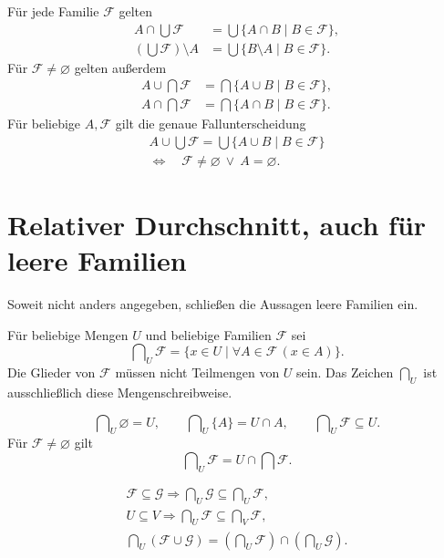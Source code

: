 \begin{theorem}
Für jede Familie $\mathcal F$ gelten
\[
\begin{aligned}
 A\cap\bigcup\mathcal F
       &=\bigcup\{A\cap B\mid B\in\mathcal F\},\\
 (\bigcup\mathcal F)\setminus A
       &=\bigcup\{B\setminus A\mid B\in\mathcal F\}.
\end{aligned}
\]
Für $\mathcal F\ne\varnothing$ gelten außerdem
\[
\begin{aligned}
 A\cup\bigcap\mathcal F
       &=\bigcap\{A\cup B\mid B\in\mathcal F\},\\
 A\cap\bigcap\mathcal F
       &=\bigcap\{A\cap B\mid B\in\mathcal F\}.
\end{aligned}
\]
Für beliebige $A,\mathcal F$ gilt die genaue Fallunterscheidung
\[
 \begin{gathered}
 A\cup\bigcup\mathcal F
       =\bigcup\{A\cup B\mid B\in\mathcal F\}\\
 \Longleftrightarrow\quad \mathcal F\ne\varnothing\ \lor\ A=\varnothing.
 \end{gathered}
\]
\end{theorem}

\section{Relativer Durchschnitt, auch für leere Familien}

Soweit nicht anders angegeben, schließen die Aussagen leere Familien ein.

\begin{definition}
Für beliebige Mengen $U$ und beliebige Familien $\mathcal F$ sei
\[
 \bigcap\nolimits_U\mathcal F
     =\{x\in U\mid\forall A\in\mathcal F\,(x\in A)\}.
\]
Die Glieder von $\mathcal F$ müssen nicht Teilmengen von $U$ sein.
Das Zeichen $\bigcap_U$ ist ausschließlich diese Mengenschreibweise.
\end{definition}

\begin{theorem}
\[
 \bigcap\nolimits_U\varnothing=U,\qquad
 \bigcap\nolimits_U\{A\}=U\cap A,\qquad
 \bigcap\nolimits_U\mathcal F\subseteq U.
\]
Für $\mathcal F\ne\varnothing$ gilt
\[
 \bigcap\nolimits_U\mathcal F=U\cap\bigcap\mathcal F.
\]
\end{theorem}

\begin{theorem}
\[
\begin{gathered}
 \mathcal F\subseteq\mathcal G
    \Rightarrow
       \bigcap\nolimits_U\mathcal G\subseteq\bigcap\nolimits_U\mathcal F,\\
 U\subseteq V\Rightarrow
       \bigcap\nolimits_U\mathcal F\subseteq\bigcap\nolimits_V\mathcal F,\\
 \bigcap\nolimits_U(\mathcal F\cup\mathcal G)
       =(\bigcap\nolimits_U\mathcal F)\cap
         (\bigcap\nolimits_U\mathcal G).
\end{gathered}
\]
\end{theorem}

